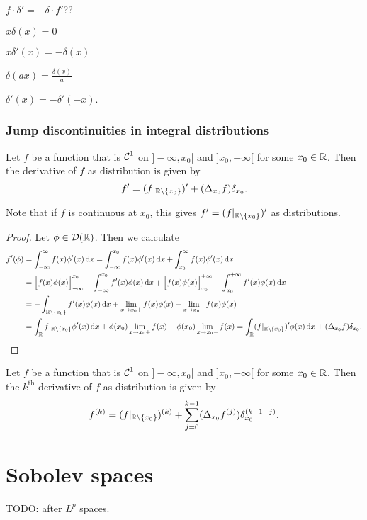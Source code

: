 \begin{proposition}
$f\cdot \delta' = -\delta \cdot f'$??

$x\delta(x) = 0$

$x \delta'(x) = -\delta(x)$

$\delta(ax) = \frac{\delta(x)}{a}$

$\delta'(x) = -\delta'(-x)$.
\end{proposition}

\subsubsection{Jump discontinuities in integral distributions}
\begin{proposition}
Let $f$ be a function that is $\operatorname{\mathcal{C}}^1$ on $]-\infty, x_0[$ and $]x_0, +\infty[$ for some $x_0\in\mathbb{R}$. Then
the derivative of $f$ as distribution is given by
\[ f' = (f|_{\mathbb{R}\setminus\{x_0\}})' + (\Delta_{x_0}f)\delta_{x_0}. \]
\end{proposition}
Note that if $f$ is continuous at $x_0$, this gives $f' = (f|_{\mathbb{R}\setminus\{x_0\}})'$ as distributions.
\begin{proof}
Let $\phi\in\operatorname{\mathcal{D}}(\mathbb{R})$. Then we calculate
\begin{align*}
f'(\phi) &= \int_{-\infty}^\infty f(x)\phi'(x)\diff{x} = \int_{-\infty}^{x_0} f(x)\phi'(x)\diff{x} + \int_{x_0}^\infty f(x)\phi'(x)\diff{x} \\
&= \Big[f(x)\phi(x)\Big]_{-\infty}^{x_0} - \int_{-\infty}^{x_0} f'(x)\phi(x)\diff{x} + \Big[f(x)\phi(x)\Big]_{x_0}^{+\infty} - \int_{x_0}^{+\infty} f'(x)\phi(x)\diff{x} \\
&= -\int_{\R\setminus\{x_0\}} f'(x)\phi(x)\diff{x} + \lim_{x\to x_0+}f(x)\phi(x)-\lim_{x\to x_0-}f(x)\phi(x) \\
&= \int_{\R}f|_{\R\setminus\{x_0\}}\phi'(x)\diff{x} + \phi(x_0)\lim_{x\to x_0+}f(x)- \phi(x_0)\lim_{x\to x_0-}f(x) = \int_{\R}(f|_{\R\setminus\{x_0\}})'\phi(x)\diff{x} + (\Delta_{x_0}f)\delta_{x_0}.
\end{align*}
\end{proof}
\begin{corollary}
Let $f$ be a function that is $\operatorname{\mathcal{C}}^1$ on $]-\infty, x_0[$ and $]x_0, +\infty[$ for some $x_0\in\mathbb{R}$. Then
the $k^\text{th}$ derivative of $f$ as distribution is given by
\[ f^{(k)} = (f|_{\mathbb{R}\setminus\{x_0\}})^{(k)} + \sum_{j=0}^{k-1}(\Delta_{x_0}f^{(j)})\delta^{(k-1-j)}_{x_0}. \]
\end{corollary}


\section{Sobolev spaces}
TODO: after $L^p$ spaces.
